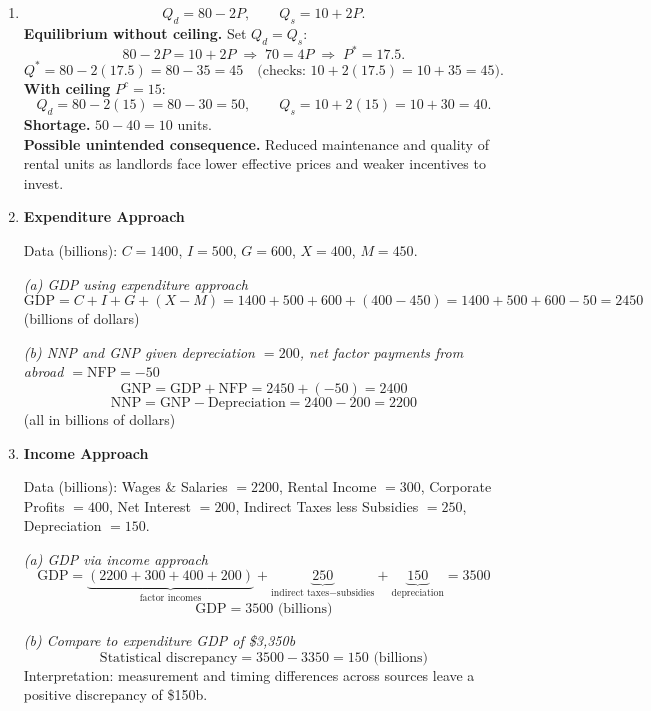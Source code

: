 \documentclass[12pt]{article}
\newcommand{\bn}{\bigskip\noindent}
\begin{document}
\begin{enumerate}
\item
\[
Q_d=80-2P,\qquad Q_s=10+2P.
\]
\textbf{Equilibrium without ceiling.} Set $Q_d=Q_s$:
\[
80-2P=10+2P \;\Rightarrow\; 70=4P \;\Rightarrow\; P^\ast=17.5.
\]
\[
Q^\ast=80-2(17.5)=80-35=45 \quad \text{(checks: }10+2(17.5)=10+35=45\text{)}.
\]
\textbf{With ceiling } $P^c=15$:
\[
Q_d=80-2(15)=80-30=50,\qquad Q_s=10+2(15)=10+30=40.
\]
\textbf{Shortage.} \; $50-40=10$ units.\\
\textbf{Possible unintended consequence.} Reduced maintenance and quality of rental units as landlords face lower effective prices and weaker incentives to invest.












\item \textbf{Expenditure Approach}

Data (billions): $C=1400$, $I=500$, $G=600$, $X=400$, $M=450$.

\bn \textit{(a) GDP using expenditure approach}
\[
\text{GDP} = C + I + G + (X - M)
= 1400 + 500 + 600 + (400 - 450)
= 1400 + 500 + 600 - 50
= \boxed{2450}
\]
(billions of dollars)

\bn \textit{(b) NNP and GNP given depreciation $=200$, net factor payments from abroad $=\text{NFP}=-50$}
\[
\text{GNP} = \text{GDP} + \text{NFP} = 2450 + (-50) = \boxed{2400}
\]
\[
\text{NNP} = \text{GNP} - \text{Depreciation} = 2400 - 200 = \boxed{2200}
\]
(all in billions of dollars)

\bigskip

\item \textbf{Income Approach}

Data (billions): Wages \& Salaries $=2200$, Rental Income $=300$, Corporate Profits $=400$, Net Interest $=200$, Indirect Taxes less Subsidies $=250$, Depreciation $=150$.

\bn \textit{(a) GDP via income approach}
\[
\text{GDP} =
\underbrace{(2200 + 300 + 400 + 200)}_{\text{factor incomes}}
+ \underbrace{250}_{\text{indirect taxes} - \text{subsidies}}
+ \underbrace{150}_{\text{depreciation}}
= 3500
\]
\[
\boxed{\text{GDP} = 3500 \text{ (billions)}}
\]

\bn \textit{(b) Compare to expenditure GDP of \$3{,}350b}
\[
\text{Statistical discrepancy} = 3500 - 3350 = \boxed{150 \text{ (billions)}}
\]
Interpretation: measurement and timing differences across sources leave a positive discrepancy of \$150b.


\end{enumerate}
\end{document}
